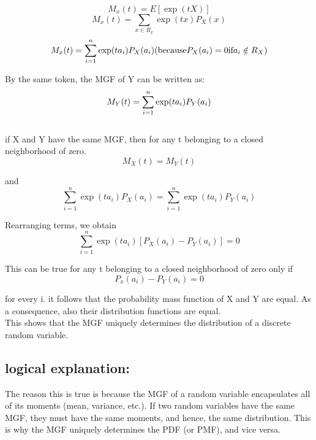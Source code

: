 \documentclass{article}
\begin{document}
\[
M_x(t) = E[\exp(tX)]
\]
\[
M_x(t) = \sum_{x \in R_x} \exp(tx)P_X(x)  
\]
\[
M_x(t) = \sum_{i = 1}^n \exp(ta_i)P_X(a_i) \space \space (\text{because} P_X(a_i)= 0 \text{if} a_i \notin R_X)
\]

By the same token, the MGF of Y can be written as: \\
\[
M_Y(t) = \sum_{i = 1}^n \exp(ta_i)P_Y(a_i) \space \space 
\] \\

if X and Y have the same MGF, then for any t belonging to a closed neighborhood of zero. \\

\[ M_X(t) = M_Y(t)\]

and \\

\[
\sum_{i = 1}^n \exp(ta_i)P_X(a_i) = \sum_{i = 1}^n \exp(ta_i)P_Y(a_i)
\]

Rearranging terms, we obtain \\
\[
\sum_{i = 1}^n \exp(ta_i)[P_X(a_i)-P_Y(a_i)] = 0
\]

This can be true for any t belonging to a closed neighborhood of zero only if \\

\[
P_x(a_i)-P_Y(a_i) =0
\]

for every i. it follows that the probability mass function of X and Y are equal. As a consequence, also their distribution functions are equal. \\

This shows that the MGF uniquely determines the distribution of a discrete random variable.

\subsection*{logical explanation:}

The reason this is true is because the MGF of a random variable encapsulates all of its moments (mean, variance, etc.). If two random variables have the same MGF, they must have the same moments, and hence, the same distribution. This is why the MGF uniquely determines the PDF (or PMF), and vice versa.
\end{document}

